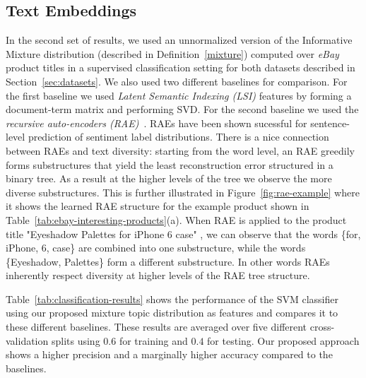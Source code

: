 \subsection{Text Embeddings}
\label{sec:text-embeddings}

In the second set of results, we used an unnormalized version of the Informative Mixture
distribution (described in Definition~\ref{mixture}) computed over
{\em eBay} product titles in a supervised classification
setting for both datasets described in Section~\ref{sec:datasets}. We also used two 
different baselines for comparison. For the first baseline we used {\em Latent Semantic Indexing (LSI)} features by forming a
document-term matrix and performing SVD. For the second baseline we used the {\em recursive auto-encoders (RAE)}~\cite{Socher:2011:SRA:2145432.2145450}. RAEs 
have been shown sucessful for sentence-level prediction of sentiment label
distributions. There is a nice connection between RAEs and text diversity: starting from the word level, an RAE greedily forms substructures that yield the least reconstruction error  structured in a  binary tree. As a result at the higher levels of the tree we observe the more diverse  substructures. This is further illustrated in Figure~\ref{fig:rae-example} where it shows the learned RAE structure for the example product shown in Table~\ref{tab:ebay-interesting-products}(a). When RAE is applied to the product title "Eyeshadow Palettes for iPhone 6 case" , we can observe that the words \{for, iPhone, 6, case\} are combined into one substructure, while the words \{Eyeshadow, Palettes\} form a different substructure. In other words RAEs inherently respect diversity at higher levels of the RAE tree structure.

Table~\ref{tab:classification-results} shows
the performance of the SVM classifier using our proposed mixture topic
distribution as features and compares it to these different baselines.
These results are averaged over five different cross-validation splits using $0.6$ for training
and $0.4$ for testing. Our proposed approach shows a higher precision
and a marginally higher accuracy compared to the baselines.
